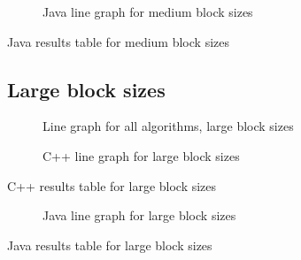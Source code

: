\begin{figure}
    \centering
    
    \caption{Java line graph for medium block sizes}
    \label{fig:java:line:medium}
\end{figure}
\begin{table}
    \centering
    \caption{Java results table for medium block sizes}
    \label{tab:java:medium}
    
\end{table}

\subsection{Large block sizes}

\begin{figure}
    \centering
    
    \caption{Line graph for all algorithms, large block sizes}
    \label{fig:all:line:large}
\end{figure}

\begin{figure}
    \centering
    
    \caption{C++ line graph for large block sizes}
    \label{fig:cpp:line:large}
\end{figure}
\begin{table}
    \centering
    \caption{C++ results table for large block sizes}
    \label{tab:cpp:large}
    \resizebox{\columnwidth}{!}{
        
    }
\end{table}


\begin{figure}
    \centering
    
    \caption{Java line graph for large block sizes}
    \label{fig:java:line:large}
\end{figure}
\begin{table}
    \centering
    \caption{Java results table for large block sizes}
    \label{tab:java:large}
    
\end{table}





